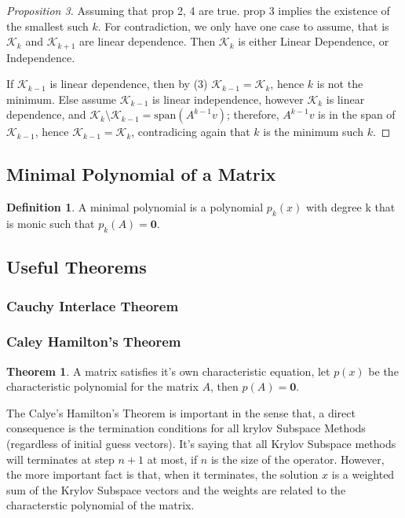 \documentclass[]{article}
\theoremstyle{definition}
\newtheorem{theorem}{Theorem}
\newtheorem{definition}{Definition}
\begin{document}
            \begin{proof}[Proposition 3]
                Assuming that prop 2, 4 are true. prop 3 implies the existence of the smallest such $k$. For contradiction, we only have one case to assume, that is $\mathcal K_k$ and $\mathcal K_{k + 1}$ are linear dependence. Then $\mathcal K_k$ is either Linear Dependence, or Independence. 
                \par
                If $\mathcal K_{k - 1}$ is linear dependence, then by (3) $\mathcal K_{k - 1} = \mathcal K_k$, hence $k$ is not the minimum. Else assume $\mathcal K_{k - 1}$ is linear independence, however $\mathcal K_k$ is linear dependence, and $\mathcal K_k \setminus \mathcal K_{k - 1} = \text{span}(A^{k - 1}v)$; therefore, $A^{k -1}v$ is in the span of $\mathcal K_{k -1}$, hence $\mathcal K_{k -1} = \mathcal K_k$, contradicing again that $k$ is the minimum such $k$. 
            \end{proof}
    \subsection{Minimal Polynomial of a Matrix}
        \begin{definition}
            A minimal polynomial is a polynomial $p_k(x)$ with degree k that is monic such that $p_k(A) = \mathbf{0}$. 
        \end{definition}
    \subsection{Useful Theorems}
        \subsubsection{Cauchy Interlace Theorem}

        \subsubsection{Caley Hamilton's Theorem}
            \begin{theorem}
                A matrix satisfies it's own characteristic equation, let $p(x)$ be the characteristic polynomial for the matrix $A$, then $p(A) = \mathbf 0$. 
            \end{theorem}
            The Calye's Hamilton's Theorem is important in the sense that, a direct consequence is the termination conditions for all krylov Subspace Methods (regardless of initial guess vectors). It's saying that all Krylov Subspace methods will terminates at step $n + 1$ at most, if $n$ is the size of the operator. However, the more important fact is that, when it terminates, the solution $x$ is a weighted sum of the Krylov Subspace vectors and the weights are related to the characterstic polynomial of the matrix. 
\end{document}

